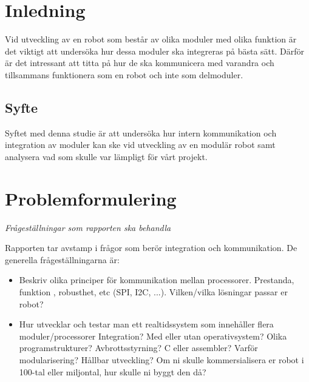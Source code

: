 \documentclass[11pt]{article}
\begin{document}
\begin{flushleft}

\section{Inledning}
Vid utveckling av en robot som består av olika moduler med olika funktion är det viktigt att undersöka hur dessa moduler ska integreras på bästa sätt. Därför är det intressant att titta på hur de ska kommunicera med varandra och tillsammans funktionera som en robot och inte som delmoduler. 


\subsection{Syfte}
Syftet med denna studie är att undersöka hur intern kommunikation och integration av moduler kan ske vid utveckling av en modulär robot samt analysera vad som skulle var lämpligt för vårt projekt.


\pagebreak

\section{Problemformulering}
\textit{Frågeställningar som rapporten ska behandla}

Rapporten tar avstamp i frågor som berör integration och kommunikation. De generella frågeställningarna är:

\begin{itemize}
	\item Beskriv olika principer för kommunikation mellan processorer. Prestanda, funktion , 
robusthet, etc (SPI, I2C, ...). Vilken/vilka lösningar passar er robot?  
	\item Hur utvecklar och testar man ett realtidssystem som innehåller flera moduler/processorer Integration? Med eller utan operativsystem? Olika programstrukturer? Avbrottsstyrning? C eller assembler? Varför modularisering? Hållbar utveckling? Om ni skulle kommersialisera er robot i 100-tal eller miljontal, hur skulle ni byggt den då? 
\end{itemize}


\end{flushleft}
\end{document}
